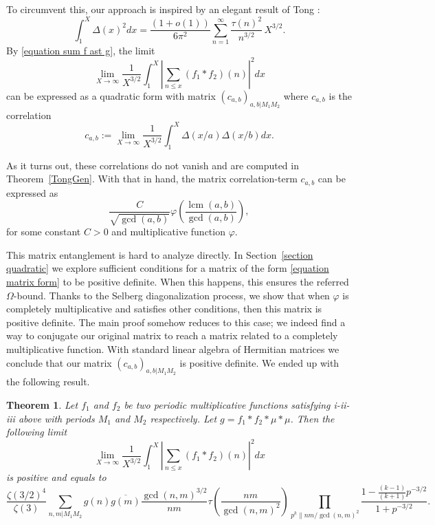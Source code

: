 \documentclass[a4paper,12pt, reqn0]{amsart}
\newtheorem{theorem}{Theorem}[section]
\theoremstyle{remark}
\DeclareMathOperator{\lcm}{lcm}
\begin{document}
To circumvent this, our approach is inspired by an elegant result of Tong \cite{Tong*56}:
\begin{equation}\label{Tong}
  \int_{1}^X\Delta(x)^2 dx=\frac{(1+o(1))}{6\pi^2}\sum_{n=1}^\infty
    \frac{\tau(n)^2}{n^{3/2}}\,X^{3/2}.
\end{equation}
By \eqref{equation sum f ast g}, the limit
$$\lim_{X\to\infty}\frac{1}{X^{3/2}}\int_{1}^X\left|\sum_{n\leq x}(f_1\ast f_2)(n)\right|^2dx$$
can be expressed as a quadratic form with matrix $(c_{a,b})_{a,b|M_1M_2}$ where $c_{a,b}$ is the correlation
\begin{equation*}
  c_{a,b}:=\lim_{X\to\infty}\frac{1}{X^{3/2}}\int_{1}^X
  \Delta(x/a)\Delta(x/b)dx.
\end{equation*}

As it turns out, these correlations do not vanish and are computed in Theorem~\ref{TongGen}.
With that in hand, the matrix correlation-term $c_{a,b}$ can be
expressed as
\begin{equation}\label{equation matrix form}
\frac{C}{\sqrt{\gcd(a,b)}}\varphi\left(\frac{\lcm(a,b)}{\gcd(a,b)}\right),
\end{equation}
for some constant $C>0$ and multiplicative function $\varphi$. 

This matrix entanglement is hard to analyze directly. In
Section~\ref{section quadratic} we explore sufficient conditions for a
matrix of the form \eqref{equation matrix form} to be positive
definite. When this happens, this ensures the referred
$\Omega$-bound. Thanks to the Selberg diagonalization process, we
show that when $\varphi$ is completely multiplicative and satisfies
other conditions, then this matrix is positive definite.
The main proof somehow reduces to this case;
we indeed find a way to conjugate our original matrix to reach
 a matrix related to a completely multiplicative
function. With standard linear algebra of Hermitian matrices we
conclude that our matrix $(c_{a,b})_{a,b|M_1M_2}$ is positive
definite. We ended up with the following result.

\begin{theorem} Let $f_1$ and $f_2$ be two periodic multiplicative functions satisfying i-ii-iii above with periods $M_1$ and $M_2$ respectively. Let $g=f_1\ast f_2\ast \mu\ast\mu$. Then the following limit 
$$\lim_{X\to\infty}\frac{1}{X^{3/2}}\int_1^X\left|\sum_{n\leq x}(f_1\ast f_2)(n)  \right|^2 dx$$
is positive and equals to
$$\frac{\zeta(3/2)^4}{\zeta(3)}\sum_{n,m|M_1M_2}g(n)\overline{g(m)}\frac{\gcd(n,m)^{3/2}}{nm}\tau\left(\frac{nm}{\gcd(n,m)^2}\right)
    \prod_{p^{k}\| nm/\gcd(n,m)^2 }  \frac{1-\tfrac{(k-1)}{(k+1)} p^{-3/2} }{1+ p^{-3/2}}.$$

    

\end{theorem}
\end{document}
